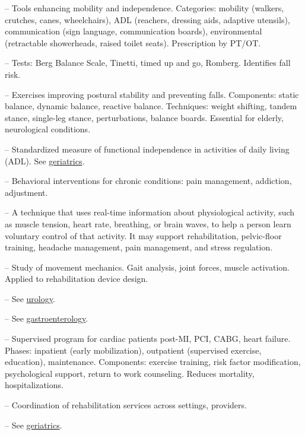 -- Tools enhancing mobility and independence. Categories: mobility (walkers, crutches, canes, wheelchairs), ADL (reachers, dressing aids, adaptive utensils), communication (sign language, communication boards), environmental (retractable showerheads, raised toilet seats). Prescription by PT/OT.

-- Tests: Berg Balance Scale, Tinetti, timed up and go, Romberg. Identifies fall risk.

-- Exercises improving postural stability and preventing falls. Components: static balance, dynamic balance, reactive balance. Techniques: weight shifting, tandem stance, single-leg stance, perturbations, balance boards. Essential for elderly, neurological conditions.

-- Standardized measure of functional independence in activities of daily living (ADL). See \hyperlink{Geriatrics}{geriatrics}.

-- Behavioral interventions for chronic conditions: pain management, addiction, adjustment.

-- A technique that uses real-time information about physiological activity, such as muscle tension, heart rate, breathing, or brain waves, to help a person learn voluntary control of that activity. It may support rehabilitation, pelvic-floor training, headache management, pain management, and stress regulation.


-- Study of movement mechanics. Gait analysis, joint forces, muscle activation. Applied to rehabilitation device design.

-- See \hyperlink{Urology}{urology}.

-- See \hyperlink{Gastroenterology}{gastroenterology}.


-- Supervised program for cardiac patients post-MI, PCI, CABG, heart failure. Phases: inpatient (early mobilization), outpatient (supervised exercise, education), maintenance. Components: exercise training, risk factor modification, psychological support, return to work counseling. Reduces mortality, hospitalizations.

-- Coordination of rehabilitation services across settings, providers.

-- See \hyperlink{Geriatrics}{geriatrics}.

